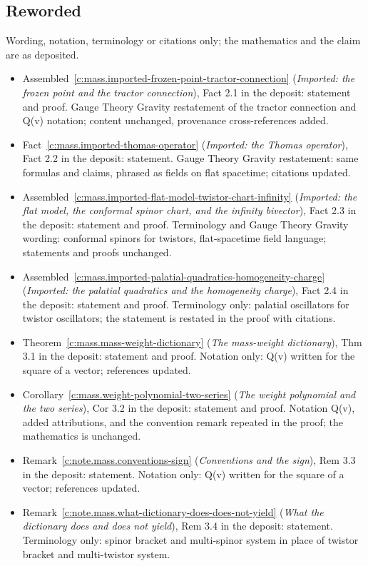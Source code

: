 \documentclass[11pt]{article}
\theoremstyle{definition}
\theoremstyle{plain}
\begin{document}
\subsection*{Reworded}
Wording, notation, terminology or citations only; the mathematics and the claim are as deposited.
\begin{itemize}\setlength{\itemsep}{2pt}
\item Assembled~\ref{c:mass.imported-frozen-point-tractor-connection} (\emph{Imported: the frozen point and the tractor connection}), Fact 2.1 in the deposit: statement and proof. Gauge Theory Gravity restatement of the tractor connection and Q(v) notation; content unchanged, provenance cross-references added.
\item Fact~\ref{c:mass.imported-thomas-operator} (\emph{Imported: the Thomas operator}), Fact 2.2 in the deposit: statement. Gauge Theory Gravity restatement: same formulas and claims, phrased as fields on flat spacetime; citations updated.
\item Assembled~\ref{c:mass.imported-flat-model-twistor-chart-infinity} (\emph{Imported: the flat model, the conformal spinor chart, and the infinity bivector}), Fact 2.3 in the deposit: statement and proof. Terminology and Gauge Theory Gravity wording: conformal spinors for twistors, flat-spacetime field language; statements and proofs unchanged.
\item Assembled~\ref{c:mass.imported-palatial-quadratics-homogeneity-charge} (\emph{Imported: the palatial quadratics and the homogeneity charge}), Fact 2.4 in the deposit: statement and proof. Terminology only: palatial oscillators for twistor oscillators; the statement is restated in the proof with citations.
\item Theorem~\ref{c:mass.mass-weight-dictionary} (\emph{The mass-weight dictionary}), Thm 3.1 in the deposit: statement and proof. Notation only: Q(v) written for the square of a vector; references updated.
\item Corollary~\ref{c:mass.weight-polynomial-two-series} (\emph{The weight polynomial and the two series}), Cor 3.2 in the deposit: statement and proof. Notation Q(v), added attributions, and the convention remark repeated in the proof; the mathematics is unchanged.
\item Remark~\ref{c:note.mass.conventions-sign} (\emph{Conventions and the sign}), Rem 3.3 in the deposit: statement. Notation only: Q(v) written for the square of a vector; references updated.
\item Remark~\ref{c:note.mass.what-dictionary-does-does-not-yield} (\emph{What the dictionary does and does not yield}), Rem 3.4 in the deposit: statement. Terminology only: spinor bracket and multi-spinor system in place of twistor bracket and multi-twistor system.

\end{itemize}
\end{document}
